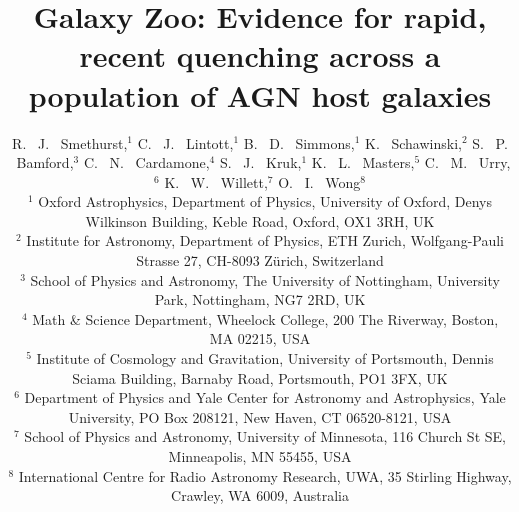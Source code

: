 \documentclass[useAMS,usenatbib]{mn2e}
\begin{document}
\title[Quenching Histories of AGN Host Galaxies]{Galaxy Zoo: Evidence for rapid, recent quenching across a population of AGN host galaxies}
\author[Smethurst et al. 2015]{R. ~J. ~Smethurst,$^{1}$ C. ~J. ~Lintott,$^{1}$ B. ~D. ~Simmons,$^{1}$ K. ~Schawinski,$^{2}$ \newauthor S. ~P. ~Bamford,$^{3}$  C. ~N. ~Cardamone,$^{4}$ S. ~J. ~Kruk,$^{1}$ K. ~L. ~Masters,$^{5}$ \newauthor C. ~M. ~Urry,$^{6}$  K. ~W. ~Willett,$^{7}$ O. ~I. ~Wong$^{8}$ \footnotemark[1]
\\ $^1$ Oxford Astrophysics, Department of Physics, University of Oxford, Denys Wilkinson Building, Keble Road, Oxford, OX1 3RH, UK 
\\ $^2$ Institute for Astronomy, Department of Physics, ETH Zurich, Wolfgang-Pauli Strasse 27, CH-8093 Z\"urich, Switzerland
\\ $^3$ School of Physics and Astronomy, The University of Nottingham, University Park, Nottingham, NG7 2RD, UK
\\ $^4$ Math \& Science Department, Wheelock College, 200 The Riverway, Boston, MA 02215, USA
\\ $^5$ Institute of Cosmology and Gravitation, University of Portsmouth, Dennis Sciama Building, Barnaby Road, Portsmouth, PO1 3FX, UK 
\\ $^6$ Department of Physics and Yale Center for Astronomy and Astrophysics, Yale University, PO Box 208121, New Haven, CT 06520-8121, USA
\\ $^7$ School of Physics and Astronomy, University of Minnesota, 116 Church St SE, Minneapolis, MN 55455, USA
\\ $^8$ International Centre for Radio Astronomy Research, UWA, 35 Stirling Highway, Crawley, WA 6009, Australia
}

\maketitle
\end{document}
